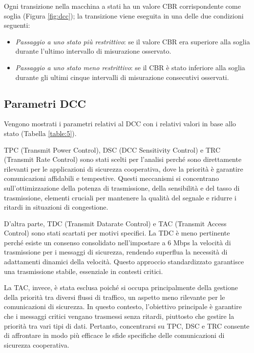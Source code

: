 Ogni transizione nella macchina a stati ha un valore CBR corrispondente come soglia (Figura \ref{fig:dcc}); la transizione viene eseguita in
una delle due condizioni seguenti:
\begin{itemize}
    \item \textit{Passaggio a uno stato più restrittivo}: se il valore CBR era superiore alla soglia durante l'ultimo intervallo di misurazione osservato.
    \item \textit{Passaggio a uno stato meno restrittivo}: se il CBR è stato inferiore alla soglia durante gli ultimi cinque intervalli di misurazione consecutivi osservati.
\end{itemize}

\subsection[Parametri DCC]{Parametri DCC}
\label{parametri_dcc}
Vengono mostrati i parametri relativi al DCC con i relativi valori in base allo stato \cite{6686471} (Tabella \ref{table:5}).

TPC (Transmit Power Control), DSC (DCC Sensitivity Control) e TRC (Transmit Rate Control) sono stati scelti per l'analisi perché sono direttamente rilevanti per le applicazioni di sicurezza cooperativa, dove la priorità è garantire comunicazioni affidabili e tempestive. Questi meccanismi si concentrano sull'ottimizzazione della potenza di trasmissione, della sensibilità e del tasso di trasmissione, elementi cruciali per mantenere la qualità del segnale e ridurre i ritardi in situazioni di congestione.

D'altra parte, TDC (Transmit Datarate Control) e TAC (Transmit Access Control) sono stati scartati per motivi specifici. La TDC è meno pertinente perché esiste un consenso consolidato nell'impostare a 6 Mbps la velocità di trasmissione per i messaggi di sicurezza, rendendo superflua la necessità di adattamenti dinamici della velocità. Questo approccio standardizzato garantisce una trasmissione stabile, essenziale in contesti critici.

La TAC, invece, è stata esclusa poiché si occupa principalmente della gestione della priorità tra diversi flussi di traffico, un aspetto meno rilevante per le comunicazioni di sicurezza. In questo contesto, l'obiettivo principale è garantire che i messaggi critici vengano trasmessi senza ritardi, piuttosto che gestire la priorità tra vari tipi di dati. Pertanto, concentrarsi su TPC, DSC e TRC consente di affrontare in modo più efficace le sfide specifiche delle comunicazioni di sicurezza cooperativa.


